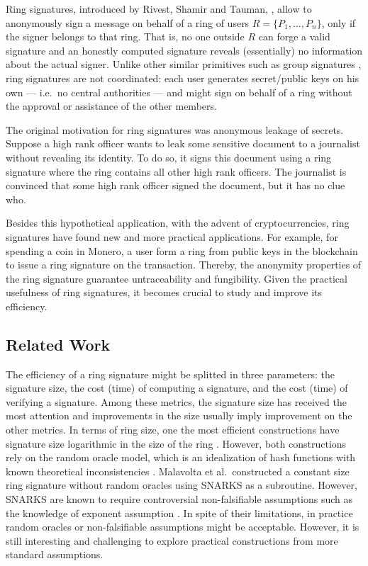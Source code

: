 
Ring signatures, introduced by Rivest, Shamir and Tauman, \cite{AC:RivShaTau01}, allow to anonymously sign a message on behalf of a ring of users $R=\{P_1,\ldots,P_n\}$, only if the signer belongs to that ring. That is, no one outside $R$ can forge a valid signature and  an honestly computed signature reveals (essentially) no information about the actual signer.  
Unlike other similar primitives such as group signatures \cite{EC:ChaVan91}, ring signatures are not coordinated: each user generates secret/public keys on his own --- i.e.~no central authorities --- and might sign on behalf of a ring without the approval or assistance of the other members.

The original motivation for ring signatures was anonymous leakage of secrets. Suppose a high rank officer wants to leak some sensitive document to a journalist without revealing its identity. To do so, it signs this document using a ring signature where the ring contains all other high rank officers. The journalist is convinced that some high rank officer signed the document, but it has no clue who.

Besides this hypothetical application, with the advent of cryptocurrencies, ring signatures have found new and more practical applications. For example, for spending a coin in Monero, a user form a ring from public keys in the blockchain to issue a ring signature on the transaction. Thereby, the anonymity properties of the ring signature guarantee untraceability and fungibility. 
Given the practical usefulness of ring signatures, it becomes crucial to study and improve its efficiency.

\subsection{Related Work}
The efficiency of a ring signature might be splitted in three parameters: the signature size, the cost (time) of computing a signature, and the cost (time) of verifying a signature. Among these metrics, the signature size has received the most attention and improvements in the size usually imply improvement on the other metrics.
In terms of ring size, one the most efficient constructions have signature size logarithmic in the size of the ring \cite{EC:GroKoh15,EC:LLNW16}. However,  both constructions rely on the {random oracle model}, which is an idealization of hash functions with known theoretical inconsistencies \cite{FOCS:GolKal03}. Malavolta et al.~constructed a constant size ring signature without random oracles \cite{AC:MalSch17} using SNARKS \cite{EC:GGPR13,AC:DFGK14,EC:Groth16} as a subroutine. However, SNARKS are known to require controversial non-falsifiable assumptions such as the knowledge of exponent assumption  \cite{STOC:GenWic11,C:Naor03} .
In spite of their limitations, in practice random oracles or non-falsifiable assumptions might be acceptable. However, it is still interesting and challenging to explore practical constructions from more standard assumptions.

